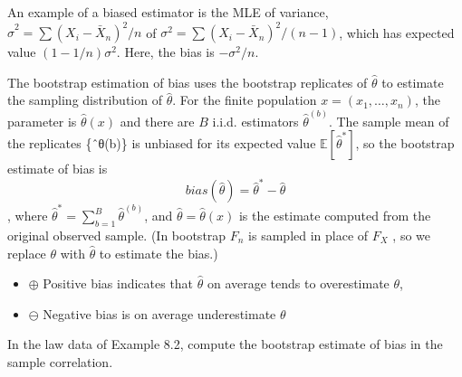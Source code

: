 \documentclass[
  letterpaper,
  DIV=11,
  numbers=noendperiod]{scrreprt}
\begin{document}
An example of a biased estimator is the MLE of variance,
\(\hat{\sigma}^2 = \sum (X_i-\bar{X}_n)^2/n\) of
\(\sigma^2 = \sum (X_i-\bar{X}_n)^2/(n-1)\), which has expected value
\((1 − 1/n)\sigma^2\). Here, the bias is \(−\sigma^2/n\).

The bootstrap estimation of bias uses the bootstrap replicates of
\(\hat \theta\) to estimate the sampling distribution of
\(\hat \theta\). For the finite population \(x = (x_1,\dots , x_n)\),
the parameter is \(\hat \theta(x)\) and there are \(B\) i.i.d.
estimators \(\hat \theta^{(b)}\). The sample mean of the replicates
\{ˆθ(b)\} is unbiased for its expected value
\(\mathbb E[\hat \theta^\ast]\), so the bootstrap estimate of bias is\\
\[bias(\hat \theta) = \hat \theta^\ast − \hat \theta\], where
\(\hat \theta^\ast  = \sum_{b=1}^B \hat \theta^{(b)}\), and
\(\hat \theta= \hat \theta(x)\) is the estimate computed from the
original observed sample. (In bootstrap \(F_n\) is sampled in place of
\(F_X\) , so we replace \(\theta\) with \(\hat \theta\) to estimate the
bias.)

\begin{tcolorbox}[enhanced jigsaw, bottomtitle=1mm, rightrule=.15mm, colframe=quarto-callout-note-color-frame, coltitle=black, opacitybacktitle=0.6, breakable, colbacktitle=quarto-callout-note-color!10!white, leftrule=.75mm, toptitle=1mm, titlerule=0mm, toprule=.15mm, opacityback=0, title=\textcolor{quarto-callout-note-color}{\faInfo}\hspace{0.5em}{Remark for estimating bias}, colback=white, arc=.35mm, bottomrule=.15mm, left=2mm]

\begin{itemize}
\item
  \(\oplus\) Positive bias indicates that \(\hat \theta\) on average
  tends to overestimate \(\theta\),
\item
  \(\ominus\) Negative bias is on average underestimate \(\theta\)
\end{itemize}

\end{tcolorbox}

In the law data of Example 8.2, compute the bootstrap estimate of bias
in the sample correlation.
\end{document}
